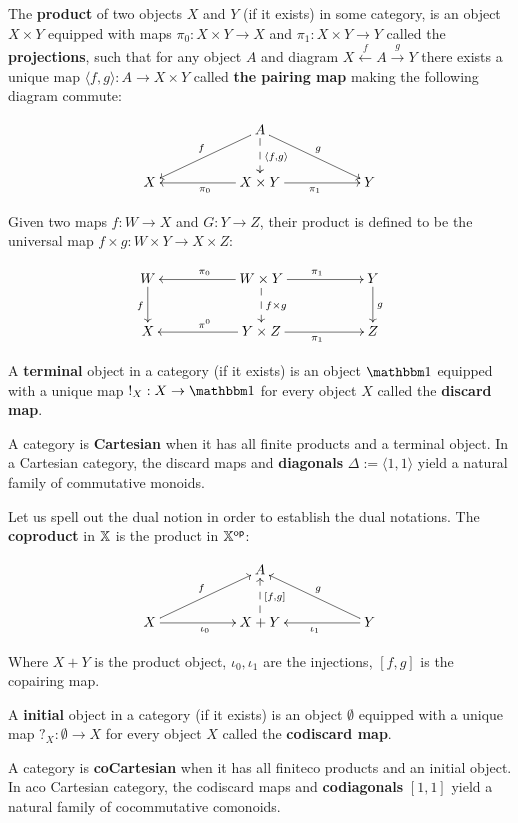 \begin{definition}
The {\bf product} of two objects $X$ and $Y$ (if it exists) in some category, is an object $X\times Y$ equipped with maps $\pi_0:X\times Y\to X $ and $\pi_1:X\times Y \to Y$ called the {\bf projections},  such that for any object $A$ and diagram  $X \xleftarrow{f} A \xrightarrow{g} Y$ there exists a unique map $\langle  f, g \rangle :A \to X\times Y$ called {\bf the pairing map} making the following diagram commute:


$$
\xymatrix{
    &
    & A \ar[lld]_f \ar[rrd]^g \ar@{-->}[d]^{\langle f,g\rangle}
    &
    &
  \\X 
    &
    & X\times Y \ar[ll]^{\pi_0} \ar[rr]_{\pi_1}
    &
    & Y
}
$$ 

Given two maps $f:W\to X$ and $G:Y\to Z$, their product is defined to be the universal map $f\times g:W\times Y \to X\times Z$: 

$$
\xymatrix{
    W \ar[d]_f
    &
    & W\times Y \ar@{-->}[d]^{f\times g} \ar[ll]_{\pi_0} \ar[rr]^{\pi_1}
    &
    & Y \ar[d]^g
  \\X
    &
    & Y\times Z  \ar[ll]_{\pi^0} \ar[rr]_{\pi_1}
    &
    &Z
}
$$


A {\bf terminal} object in a category (if it exists) is an object $\one$ equipped with a unique map $!_X:X\to \one$ for every object $X$ called the {\bf discard map}.



A category is  {\bf Cartesian} when it has all finite products and a terminal object. In a Cartesian category, the discard maps and {\bf diagonals} $\Delta:=\langle 1, 1 \rangle$ yield a natural family of commutative monoids.





Let us spell out the dual notion in order to establish the dual notations.
The {\bf coproduct} in $\mathbb{X}$ is the product in $\mathbb{X}^{\mathsf{op}}$:

$$
\xymatrix{
    &
    & A
    &
    &
  \\X \ar[urr]^{f} \ar[rr]_{\iota_0}
    &
    & X+  Y \ar@{-->}[u]_{[f,g]} 
    &
    & Y\ar[ull]_{g}  \ar[ll]^{\iota_1}
}
$$ 

Where $ X+  Y $ is the product object,  $\iota_0,\iota_1$ are the injections,   $[f,g]$ is the copairing map.


A {\bf initial} object in a category (if it exists) is an object $\emptyset$ equipped with a unique map $?_X: \emptyset\to  X$ for every object $X$ called the {\bf codiscard map}.

A category is  {\bf coCartesian} when it has all finiteco products and an initial object. In aco Cartesian category, the codiscard maps and {\bf codiagonals} $[ 1, 1 ]$ yield a natural family of cocommutative comonoids.
\end{definition}



